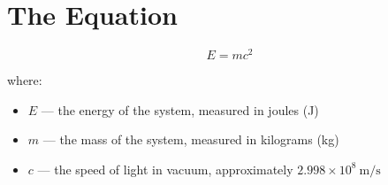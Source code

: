 \section{The Equation}
\begin{equation}
  E = mc^2
  \label{eq:mass-energy}
\end{equation}

\noindent where:
\begin{itemize}
  \item $E$ --- the energy of the system, measured in joules (J)
  \item $m$ --- the mass of the system, measured in kilograms (kg)
  \item $c$ --- the speed of light in vacuum,
        approximately $2.998 \times 10^{8}\ \text{m/s}$
\end{itemize}

